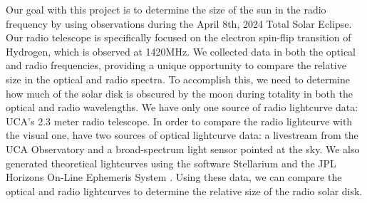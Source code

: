 Our goal with this project is to determine the size of the sun in the radio frequency by using observations during the April 8th, 2024 Total Solar Eclipse.
Our radio telescope is specifically focused on the electron spin-flip transition of Hydrogen, which is observed at 1420MHz.
We collected data in both the optical and radio frequencies, providing a unique opportunity to compare the relative size in the optical and radio spectra.
To accomplish this, we need to determine how much of the solar disk is obscured by the moon during totality in both the optical and radio wavelengths.
We have only one source of radio lightcurve data: UCA's 2.3 meter radio telescope.
In order to compare the radio lightcurve with the visual one, have two sources of optical lightcurve data: a livestream from the UCA Observatory and a broad-spectrum light sensor pointed at the sky.
We also generated theoretical lightcurves using the software Stellarium \cite{zotti_simulated_2020} and the JPL Horizons On-Line Ephemeris System \cite{nasa_jpl_solar_system_dynamics_group_jpl_nodate}.
Using these data, we can compare the optical and radio lightcurves to determine the relative size of the radio solar disk.
